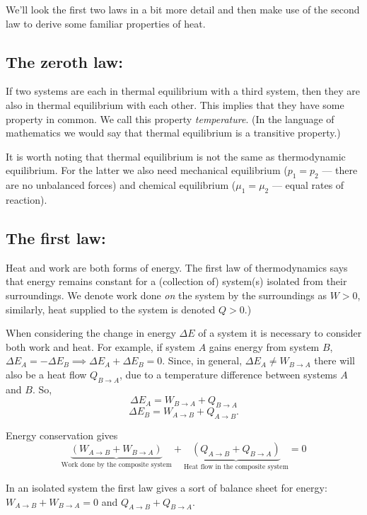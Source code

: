 We'll look the first two laws in a bit more detail and then make use of the second law to derive some familiar properties of heat.

\subsection{The zeroth law:}
If two systems are each in thermal equilibrium with a third system, then they are also in thermal equilibrium with each other. This implies that they have some property in common. We call this property \emph{temperature}. (In the language of mathematics we would say that thermal equilibrium is a transitive property.)

It is worth noting that thermal equilibrium is not the same as thermodynamic equilibrium. For the latter we also need mechanical equilibrium ($p_1=p_2$ --- there are no unbalanced forces) and chemical equilibrium ($\mu_1=\mu_2$ --- equal rates of reaction).

\subsection{The first law:}
Heat and work are both forms of energy. The first law of thermodynamics says that energy remains constant for a (collection of) system(s) isolated from their surroundings. We denote work done \emph{on} the system by the surroundings as $W>0$, similarly, heat supplied to the system is denoted $Q>0$.)

When considering the change in energy $\Delta E$ of a system it is necessary to consider both work and heat. For example, if system $A$ gains energy from system $B$, $\Delta E_A = -\Delta E_B \implies \Delta E_A + \Delta E_B =0$. Since, in general, $\Delta E_A\neq W_{B\rightarrow A}$ there will also be a heat flow $Q_{B\rightarrow A}$, due to a temperature difference between systems $A$ and $B$.
So,
$$\Delta E_A = W_{B\rightarrow A} + Q_{B\rightarrow A}$$
$$\Delta E_B = W_{A\rightarrow B} + Q_{A\rightarrow B}.$$

Energy conservation gives 
$$\underbrace{(W_{A\rightarrow B}+W_{B\rightarrow A})}_{\text{Work done by the composite system}} + \underbrace{(Q_{A\rightarrow B}+Q_{B\rightarrow A})}_{\text{Heat flow in the composite system}} = 0$$

In an isolated system the first law gives a sort of balance sheet for energy:
$W_{A\rightarrow B}+W_{B\rightarrow A} = 0$ and $Q_{A\rightarrow B}+Q_{B\rightarrow A}$.



